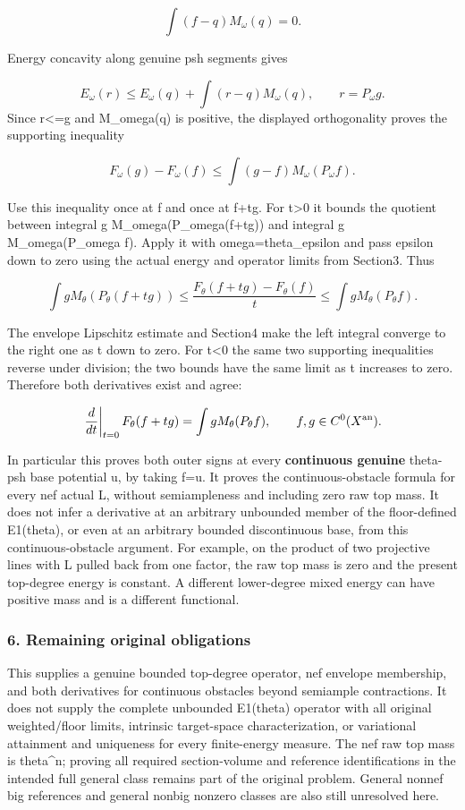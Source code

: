 \documentclass[
]{article}
\begin{document}
\[\int(f-q)M_\omega(q)=0.\]

Energy concavity along genuine psh segments gives

\[E_\omega(r)\leq E_\omega(q)+\int(r-q)M_\omega(q),\qquad r=P_\omega g.\]
Since r\textless=g and M\_omega(q) is positive, the displayed
orthogonality proves the supporting inequality

\[F_\omega(g)-F_\omega(f)\leq\int(g-f)M_\omega(P_\omega f).\]

Use this inequality once at f and once at f+tg. For t\textgreater0 it
bounds the quotient between integral g M\_omega(P\_omega(f+tg)) and
integral g M\_omega(P\_omega f). Apply it with omega=theta\_epsilon and
pass epsilon down to zero using the actual energy and operator limits
from Section3. Thus

\[\int gM_\theta(P_\theta(f+tg))\leq
\frac{F_\theta(f+tg)-F_\theta(f)}t\leq
\int gM_\theta(P_\theta f).\]

The envelope Lipschitz estimate and Section4 make the left integral
converge to the right one as t down to zero. For t\textless0 the same
two supporting inequalities reverse under division; the two bounds have
the same limit as t increases to zero. Therefore both derivatives exist
and agree:

\[\left.\frac{d}{dt}\right|_{t=0}F_\theta(f+tg)=\int gM_\theta(P_\theta f),\qquad f,g\in C^0(X^{\rm an}).\]

In particular this proves both outer signs at every \textbf{continuous
genuine} theta-psh base potential u, by taking f=u. It proves the
continuous-obstacle formula for every nef actual L, without
semiampleness and including zero raw top mass. It does not infer a
derivative at an arbitrary unbounded member of the floor-defined
E1(theta), or even at an arbitrary bounded discontinuous base, from this
continuous-obstacle argument. For example, on the product of two
projective lines with L pulled back from one factor, the raw top mass is
zero and the present top-degree energy is constant. A different
lower-degree mixed energy can have positive mass and is a different
functional.

\subsubsection{6. Remaining original
obligations}\label{remaining-original-obligations}

This supplies a genuine bounded top-degree operator, nef envelope
membership, and both derivatives for continuous obstacles beyond
semiample contractions. It does not supply the complete unbounded
E1(theta) operator with all original weighted/floor limits, intrinsic
target-space characterization, or variational attainment and uniqueness
for every finite-energy measure. The nef raw top mass is theta\^{}n;
proving all required section-volume and reference identifications in the
intended full general class remains part of the original problem.
General nonnef big references and general nonbig nonzero classes are
also still unresolved here.
\end{document}
